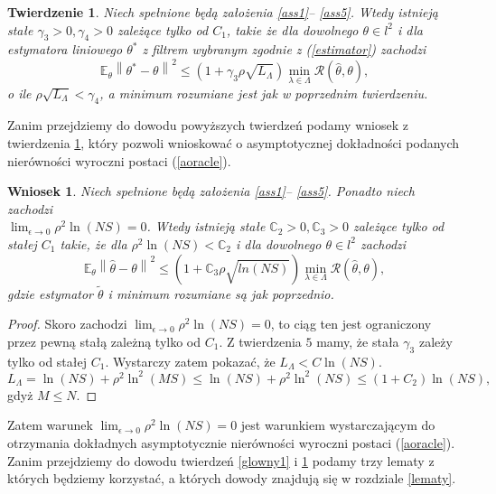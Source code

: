 \documentclass[man,mfiu]{mgrwms}
\newcommand{\norm}[1]{\left\lVert#1\right\rVert}
\newtheorem{tw}{Twierdzenie}[chapter]
\newtheorem{wn}{Wniosek}[chapter]
\begin{document}
\begin{tw}\label{glowny2}
Niech spełnione będą założenia \ref{ass1}-- \ref{ass5}. Wtedy istnieją stałe $\gamma_3>0,\gamma_4>0$ zależące tylko od $C_1$, takie że dla dowolnego $\theta\in l^2$ i dla estymatora liniowego $\theta^*$ z filtrem wybranym zgodnie z (\ref{estimator}) zachodzi
\begin{displaymath}
\mathbb{E}_{\theta}\norm{\theta^*-\theta}^2\leq (1+\gamma_3\rho\sqrt{L_{\Lambda}})\min_{\lambda\in \Lambda}\mathcal{R}(\hat{\theta},\theta),
\end{displaymath}
o ile $\rho\sqrt{L_{\Lambda}}<\gamma_4$, a minimum rozumiane jest jak w poprzednim twierdzeniu.
\end{tw}
Zanim przejdziemy do dowodu powyższych twierdzeń podamy wniosek z twierdzenia \ref{glowny2}, który pozwoli wnioskować o asymptotycznej dokładności podanych nierówności wyroczni postaci (\ref{aoracle}).
\begin{wn}
Niech spełnione będą założenia \ref{ass1}-- \ref{ass5}. Ponadto niech zachodzi \\$\lim_{\epsilon\to 0}\rho^2\ln(NS)=0$. Wtedy istnieją stałe $\mathbb{C}_2>0,\mathbb{C}_3>0$ zależące tylko od stałej $C_1$ takie, że dla $\rho^2\ln(NS)<\mathbb{C}_2$ i dla dowolnego $\theta\in l^2$ zachodzi
\begin{displaymath}
\mathbb{E}_{\theta}\norm{\hat{\theta}-\theta}^2\leq \left(1+\mathbb{C}_3\rho\sqrt{ln(NS)}\right)\min_{\lambda\in \Lambda}\mathcal{R}(\hat{\theta},\theta),
\end{displaymath}
gdzie estymator $\tilde{\theta}$ i minimum rozumiane są jak poprzednio.
\end{wn}
\begin{proof}
Skoro zachodzi $\lim_{\epsilon\to 0}\rho^2\ln(NS)=0$, to ciąg ten jest ograniczony przez pewną stałą zależną tylko od $C_1$. Z twierdzenia $5$ mamy, że stała $\gamma_3$ zależy tylko od stałej $C_1$. Wystarczy zatem pokazać, że $L_{\Lambda}<C\ln(NS)$. 
\begin{displaymath}
L_{\Lambda}=\ln(NS)+\rho^2\ln^2(MS)\leq \ln(NS)+\rho^2\ln^2(NS)\leq (1+C_2)\ln(NS),
\end{displaymath}
gdyż $M\leq N$.
\end{proof}
$\ $\\
Zatem warunek $\lim_{\epsilon\to 0}\rho^2\ln(NS)=0$ jest warunkiem wystarczającym do otrzymania dokładnych asymptotycznie nierówności wyroczni postaci (\ref{aoracle}).\\
\indent Zanim przejdziemy do dowodu twierdzeń \ref{glowny1} i \ref{glowny2} podamy trzy lematy z których będziemy korzystać, a których dowody znajdują się w rozdziale \ref{lematy}.
\end{document}
